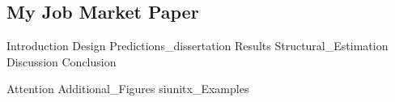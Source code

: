 \documentclass[11pt, a4paper, twoside]{book}
\begin{document}
\begin{refsection}

\makeatletter
\renewcommand{\@makefntext}[1]{\@makefntextorig{#1}}
\makeatother
\chapter
	[My Job Market Paper]
	{My Job Market Paper%
	 \setcounter{footnote}{1}\textsuperscript{\Large{}}%
	}
\label{diss:JMP}
\renewcommand{\thefootnote}{\fnsymbol{footnote}}
\footnotetext[1]{\:\protect}
\renewcommand{\thefootnote}{\thefootnoteorig}
\makeatletter
\renewcommand{\@makefntext}[1]{\@makefntextcustom{#1}}
\renewcommand{\@makefnmark}{\@makefnmarkorig}
\makeatother
\setcounter{footnote}{0}

\graphicspath{{1_Example_Content/}}
{Introduction}
{Design}
{Predictions_dissertation}
{Results}
{Structural_Estimation}
{Discussion}
{Conclusion}

\FloatBarrier
\clearpage

\begin{subappendices}
	\label{sec:appendix}
	{Attention}
	\FloatBarrier
	\clearpage
	{Additional_Figures}
	\FloatBarrier
	\clearpage
	{siunitx_Examples}
	\clearpage
	\FloatBarrier
\end{subappendices}

\begin{refcontext}[sorting=nyt]
	\printbibliography[heading=subbibliography]
\end{refcontext}

\end{refsection}
\end{document}
